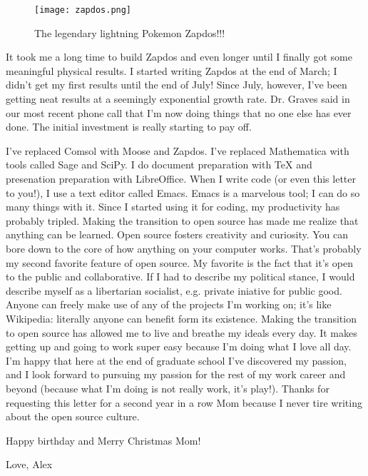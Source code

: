 \documentclass[11pt]{article}
\begin{document}
\begin{figure}[htpb]
    \centering
        \texttt{[image: zapdos.png]}
    \caption{The legendary lightning Pokemon Zapdos!!!}
    \label{fig:zapdos}
\end{figure}

It took me a long time to build Zapdos and even longer until I finally got some meaningful physical results. I started writing Zapdos at the end of March; I didn't get my first results until the end of July! Since July, however, I've been getting neat results at a seemingly exponential growth rate. Dr. Graves said in our most recent phone call that I'm now doing things that no one else has ever done. The initial investment is really starting to pay off. 

I've replaced Comsol with Moose and Zapdos. I've replaced Mathematica with tools called Sage and SciPy. I do document preparation with TeX and presenation preparation with LibreOffice. When I write code (or even this letter to you!), I use a text editor called Emacs. Emacs is a marvelous tool; I can do so many things with it. Since I started using it for coding, my productivity has probably tripled. Making the transition to open source has made me realize that anything can be learned. Open source fosters creativity and curiosity. You can bore down to the core of how anything on your computer works. That's probably my second favorite feature of open source. My favorite is the fact that it's open to the public and collaborative. If I had to describe my political stance, I would describe myself as a libertarian socialist, e.g. private iniative for public good. Anyone can freely make use of any of the projects I'm working on; it's like Wikipedia: literally anyone can benefit form its existence. Making the transition to open source has allowed me to live and breathe my ideals every day. It makes getting up and going to work super easy because I'm doing what I love all day. I'm happy that here at the end of graduate school I've discovered my passion, and I look forward to pursuing my passion for the rest of my work career and beyond (because what I'm doing is not really work, it's play!). Thanks for requesting this letter for a second year in a row Mom because I never tire writing about the open source culture.

Happy birthday and Merry Christmas Mom!

Love, Alex
\end{document}
